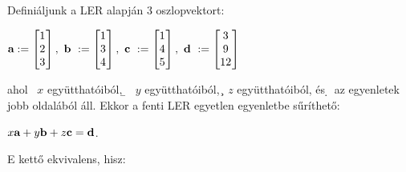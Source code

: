 \documentclass[a4paper,11.5pt]{article}
\begin{document}
	\noindent Definiáljunk a LER alapján 3 oszlopvektort:
	
	{\centering
		$\a:=
		\begin{bmatrix}
		1\s \\
		2\s \\
		3\s \\
		\end{bmatrix},~
		\b~:=
		\begin{bmatrix}
		1\s \\
		3\s \\
		4\s \\
		\end{bmatrix},~
		\c~:=
		\begin{bmatrix}
		1\s \\
		4\s \\
		5\s \\
		\end{bmatrix},~
		\d~:=
		\begin{bmatrix}
		3\s \\
		9\s \\
		12\s \\
		\end{bmatrix}$
	\par}
	
	\noindent ahol \a~$x$ együtthatóiból, \b~ $y $ együtthatóiból, \c~$z$ együtthatóiból, és \d~az egyenletek jobb oldalából áll. Ekkor a fenti LER egyetlen egyenletbe sűríthető:
	
	{\centering
		$x\textbf{a} + y\textbf{b} + z\textbf{c} = \textbf{d}$.
	\par}
	
	\noindent E kettő ekvivalens, hisz:
	
\end{document}
